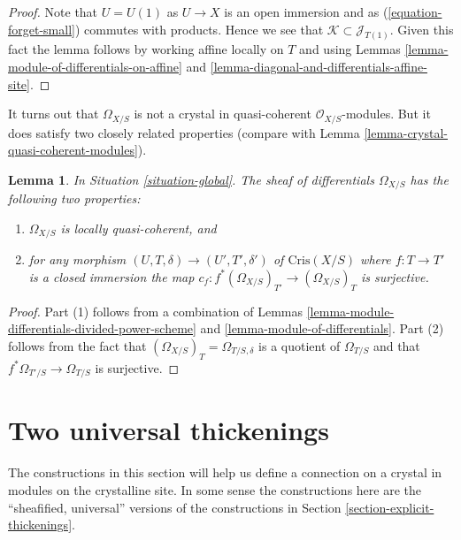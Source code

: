 \documentclass{stacks-project}
\theoremstyle{plain}
\newtheorem{lemma}[subsection]{Lemma}
\theoremstyle{definition}
\theoremstyle{remark}
\numberwithin{equation}{subsection}
\begin{document}
\begin{proof}
Note that $U = U(1)$ as $U \to X$ is an open immersion and as
(\ref{equation-forget-small}) commutes with products. Hence we see that
$\mathcal{K} \subset \mathcal{J}_{T(1)}$. Given this fact the lemma follows
by working affine locally on $T$ and using
Lemmas \ref{lemma-module-of-differentials-on-affine} and
\ref{lemma-diagonal-and-differentials-affine-site}.
\end{proof}

\noindent
It turns out that $\Omega_{X/S}$ is not a crystal in quasi-coherent
$\mathcal{O}_{X/S}$-modules. But it does satisfy two closely
related properties (compare with
Lemma \ref{lemma-crystal-quasi-coherent-modules}).

\begin{lemma}
\label{lemma-omega-locally-quasi-coherent}
In Situation \ref{situation-global}.
The sheaf of differentials $\Omega_{X/S}$ has the following two
properties:
\begin{enumerate}
\item $\Omega_{X/S}$ is locally quasi-coherent, and
\item for any morphism $(U, T, \delta) \to (U', T', \delta')$
of $\text{Cris}(X/S)$ where $f : T \to T'$ is a closed immersion
the map $c_f : f^*(\Omega_{X/S})_{T'} \to (\Omega_{X/S})_T$ is surjective.
\end{enumerate}
\end{lemma}

\begin{proof}
Part (1) follows from a combination of
Lemmas \ref{lemma-module-differentials-divided-power-scheme} and
\ref{lemma-module-of-differentials}.
Part (2) follows from the fact that
$(\Omega_{X/S})_T = \Omega_{T/S, \delta}$
is a quotient of $\Omega_{T/S}$ and that $f^*\Omega_{T'/S} \to \Omega_{T/S}$
is surjective.
\end{proof}







\section{Two universal thickenings}
\label{section-universal-thickenings}

\noindent
The constructions in this section will help us define a connection on
a crystal in modules on the crystalline site. In some sense the constructions
here are the ``sheafified, universal'' versions of the constructions in
Section \ref{section-explicit-thickenings}.
\end{document}
